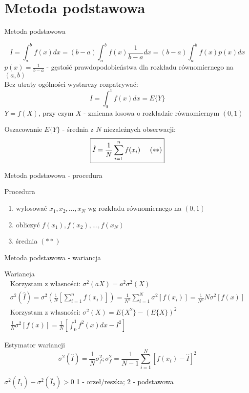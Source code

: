 \section{Metoda podstawowa}
\begin{frame}{Metoda podstawowa}
	
    	$$I = \int_a^b f(x) dx = (b-a) \int_a^b f(x) \frac{1}{b-a} dx=
    	(b-a) \int_a^b f(x) p(x) dx$$ $p(x)=\frac{1}{b-a}$ - gęstość prawdopodobieństwa dla rozkładu równomiernego na $(a, b)$\\
    Bez utraty ogólności wystarczy rozpatrywać: 
    \[
    	I = \int_0^1 f(x) dx = E\{Y\}
    \]
    $Y = f(X)$, przy czym $X$ - zmienna losowa o rozkładzie równomiernym $(0, 1)$
    
    Oszacowanie $E\{Y\}$ - średnia z $N$ niezależnych obserwacji: \[
    	\boxed{
        \hat{I} = \frac{1}{N} \sum_{i=1}^n f(x_i) \hspace{.5cm} (**)
        }
    \]
\end{frame}
\begin{frame}{Metoda podstawowa - procedura}
    \begin{block}{Procedura}
        \begin{enumerate}
            \item wylosować $x_1, x_2, ..., x_N$ wg rozkładu równomiernego na $(0, 1)$
            \item obliczyć $f(x_1), f(x_2), ..., f(x_N)$
            \item średnia $(**)$
        \end{enumerate}
    \end{block}
\end{frame}
\begin{frame}{Metoda podstawowa - wariancja}
	\vspace{-.5cm}
	\begin{block}{Wariancja}
		\begin{align*}
	\text{Korzystam z własności: }	\sigma^2(aX)=a^2\sigma^2(X)\\
			\sigma^2(\hat{I}) = 
            \sigma^2 (\frac{1}{N} \left[ 
            	\sum_{i=1}^n f(x_i)
            	\right]) =
            \frac{1}{N^2} \sum_{i=1}^N \sigma^2 [f(x_i)] = \frac{1}{N^2} N \sigma^2 [f(x)]
            \\
            	\text{Korzystam z własności: }	\sigma^2(X)=E\{X^2\}-(E\{X\})^2\\
            \frac{1}{N} \sigma^2 [f(x)] = 
            \frac{1}{N} \left[ 
            	\int_0^1 f^2(x)dx - I^2
            	\right]
		\end{align*}
	\end{block}
    
    \begin{block}{Estymator wariancji}
    	\[
        	\sigma^2(\hat{I}) = \frac{1}{N} \sigma_f^2; 
            \sigma_f^2 = \frac{1}{N-1} \sum_{i=1}^N [f(x_i) - \hat{I}]^2
        \]
    \end{block}
    
    $\sigma^2(\hat{I}_1) - \sigma^2(\hat{I}_2) > 0$ \hspace{.5cm}
    1 - orzeł/reszka; \hspace{.5cm}
    2 - podstawowa
\end{frame}